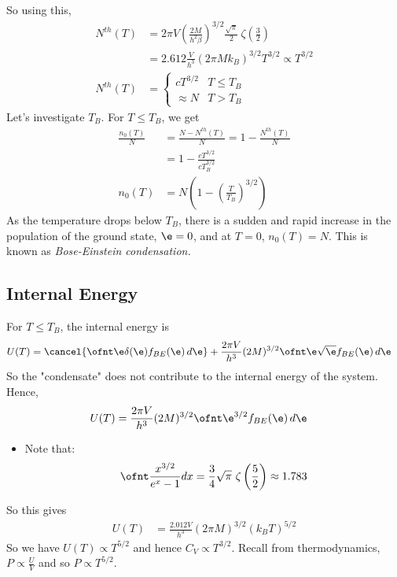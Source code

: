 \documentclass[a4paper, 11pt, normalem]{report}
\begin{document}
So using this, 
\begin{align}
    N^{th}(T) &= 2\pi V\left(\frac{2M}{h^2\beta}\right)^{3/2}\frac{\sqrt{\pi}}{2}~\zeta\left(\frac{3}{2}\right) \\
              &= 2.612\frac{V}{h^3}(2\pi Mk_B)^{3/2}T^{3/2} \propto T^{3/2} \\
    N^{th}(T) &= \begin{cases} cT^{3/2} & T \leq T_B \\ \approx N & T > T_B \end{cases}
\end{align}
Let's investigate $T_B$.
For $T \leq T_B$, we get
\begin{align}
    \frac{n_0(T)}{N} &= \frac{N-N^{th}(T)}{N} = 1 - \frac{N^{th}(T)}{N} \\
                     &= 1 - \frac{c T^{3/2}}{c T_B^{3/2}} \\
    n_0(T) &= N\left(1 - \left(\frac{T}{T_B}\right)^{3/2}\right)
\end{align}
As the temperature drops below $T_B$, there is a sudden and rapid increase in the population of the ground state, $\e = 0$, and at $T=0$, $n_0(T) = N$.
This is known as \emph{Bose-Einstein condensation.}

\subsection{Internal Energy}
For $T \leq T_B$, the internal energy is
\begin{align}
    U(T) &= \cancel{\ofnt \e\delta(\e)f_{BE}(\e)\,d\e} + \frac{2\pi V}{h^3}(2M)^{3/2} \ofnt \e\sqrt{\e}f_{BE}(\e)\,d\e
\end{align}
So the "condensate" does not contribute to the internal energy of the system.
Hence, 
\begin{align}
    U(T) &= \frac{2\pi V}{h^3}(2M)^{3/2}\ofnt \e^{3/2}f_{BE}(\e)\,d\e
\end{align}
\begin{itemize}
    \item Note that:
        \begin{equation}
            \ofnt \frac{x^{3/2}}{e^x -1}dx = \frac{3}{4}\sqrt{\pi}~\zeta\left(\frac{5}{2}\right) \approx 1.783
        \end{equation}
\end{itemize}
So this gives
\begin{align}
    U(T) &= \frac{2.012V}{h^3}(2\pi M)^{3/2}(k_BT)^{5/2}
\end{align}
So we have $U(T) \propto T^{5/2}$ and hence $C_V \propto T^{3/2}$.
Recall from thermodynamics, $P \propto \frac{U}{V}$ and so $P \propto T^{5/2}$.
\end{document}
